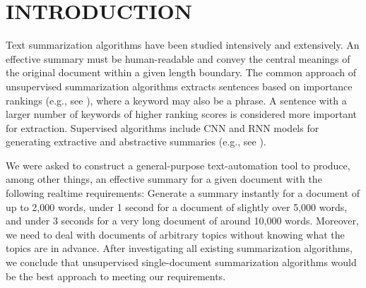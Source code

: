 \documentclass[a4paper,twoside]{article}
\begin{document}
\section{\uppercase{Introduction}}
\label{sec:introduction}
\noindent Text summarization algorithms have been studied intensively and extensively.
An effective summary must
be human-readable and %
convey the central meanings of the original document within
a given length boundary. %
The common approach of unsupervised summarization algorithms
extracts sentences based on importance rankings (e.g., see \cite{DUC02,Mihalcea04,Rose:10,lin:11,ParveenR015}),
where a keyword may also
be a phrase. %
A sentence with a larger number of keywords of higher ranking scores is considered more important %
for extraction.
Supervised algorithms include
CNN and RNN models %
for generating extractive and abstractive summaries (e.g., see \cite{RushCW15,NallapatiZSGX16,ChengL16a}). %
%
%

We were asked to construct a general-purpose text-automation tool to produce, among other things, an effective
summary for a given document with the following realtime requirements: Generate a summary instantly for a document of
up to 2,000 words, under 1 second for
a document of slightly over 5,000 words, and under 3 seconds for a very long document of around 10,000 words.
Moreover, we need to deal with documents of arbitrary topics without knowing what the topics are in advance.
After investigating all existing summarization algorithms,
we conclude that unsupervised single-document summarization algorithms would be the best approach to meeting
our requirements. %
\end{document}

